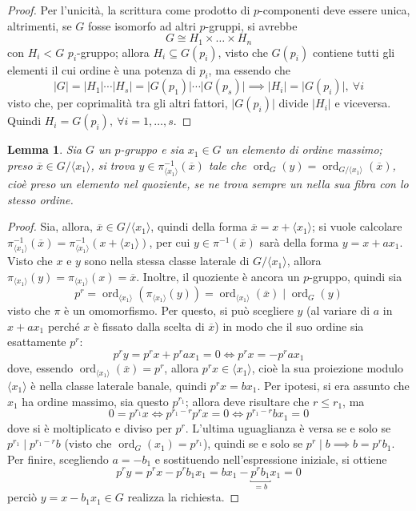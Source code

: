 \documentclass[11pt]{article}
\theoremstyle{style}
\newtheorem{lemma}{Lemma}[teorema]
\numberwithin{equation}{subsection}
\begin{document}
\begin{proof}
		Per l'unicit\`a, la scrittura come prodotto di $p$-componenti deve essere unica, altrimenti, se $G$ fosse isomorfo ad altri $p$-gruppi, si avrebbe
		\[
		G \cong H_1\times \ldots\times H_n
		\] 
		con $H_i<G$ $p_i$-gruppo; allora $H_i \subseteq G(p_i)$, visto che $G(p_i)$ contiene tutti gli elementi il cui ordine \`e una potenza di $p_i$, ma essendo che
		\[
		\lvert G \rvert =\lvert H_1 \rvert \cdots \lvert H_s \rvert = \lvert G(p_1) \rvert \cdots\lvert G(p_s) \rvert \implies \lvert H_i \rvert =\lvert G(p_i) \rvert , \ \forall i
		\] 
		visto che, per coprimalit\`a tra gli altri fattori, $\lvert G(p_i) \rvert  $ divide $ \lvert H_i \rvert $ e viceversa. Quindi $H_i = G(p_i), \ \forall i = 1,\ldots,s$.
\end{proof}
\begin{lemma}
	Sia $G$ un $p$-gruppo e sia $x_1\in G$ un elemento di ordine massimo; preso $\overline{x} \in G / \langle x_1 \rangle$, si trova $y \in \pi^{-1}_{\langle x_1 \rangle} (\overline{x})$ tale che $\operatorname{ord}_G(y)= \operatorname{ord}_{G/\langle x_1 \rangle} ( \overline{x})  $, cio\`e preso un elemento nel quoziente, se ne trova sempre un nella sua fibra con lo stesso ordine.
\end{lemma}
	\begin{proof}
		Sia, allora, $\overline{x}\in G / \langle x_1 \rangle$, quindi della forma $\overline{x}= x + \langle x_1 \rangle$; si vuole calcolare $\pi^{-1}_{\langle x_1 \rangle} (\overline{x}) = \pi^{-1}_{\langle x_1 \rangle} (x+\langle x_1 \rangle)$, per cui $y  \in \pi^{-1}(\overline{x})$ sar\`a della forma $y = x + ax_1$.
		Visto che $x$ e $y$ sono nella stessa classe laterale di $G / \langle x_1 \rangle$, allora $\pi_{\langle x_1 \rangle} (y) = \pi_{\langle x_1 \rangle} (x)= \overline{x}$.
		Inoltre, il quoziente \`e ancora un $p$-gruppo, quindi sia
		\[
		p^r = \operatorname{ord}_{\langle x_1 \rangle} (\pi_{\langle x_1 \rangle} (y)) =\operatorname{ord}_{\langle x_1 \rangle} (\overline{x})  \mid \operatorname{ord}_G(y) 
		\] 
		visto che $\pi$ \`e un omomorfismo.
		Per questo, si pu\`o scegliere $y$ (al variare di $a$ in $x+ ax_1$ perch\'e $x$ \`e fissato dalla scelta di $\overline{x}$) in modo che il suo ordine sia esattamente $p^r$:
		\[
		p^r y = p^r x + p^r ax_1 = 0 \iff p^r x = - p^r ax_1
		\] 
		dove, essendo $\operatorname{ord}_{\langle x_1 \rangle} (\overline{x}) =p^r$, allora $p^r x \in \langle x_1 \rangle$, cio\`e la sua proiezione modulo $\langle x_1 \rangle$ \`e nella classe laterale banale, quindi $p^rx = bx_1$.
		Per ipotesi, si era assunto che $x_1$ ha ordine massimo, sia questo $p^{r_1} $; allora deve risultare che $r\le r_1$, ma 
		\[
		0 = p^{r_1} x \iff p^{r_1-r} p^r x = 0 \iff p^{r_1-r} bx_1=0
		\] 
		dove si \`e moltiplicato e diviso per $p^r$. 
		L'ultima uguaglianza \`e versa se e solo se $p^{r_1}  \mid p^{r_1-r} b$ (visto che $\operatorname{ord}_G(x_1) =p^{r_1} $), quindi se e solo se $p^r  \mid b \implies b = p^r b_1$.
		Per finire, scegliendo $a = -b_1$  e sostituendo nell'espressione iniziale, si ottiene 
		\[
			p^r y = p^r x - p^r b_1x_1=bx_1 - \underbracket{p^r b_1}_{=b}  x_1 = 0
		\] 
		perci\`o $y= x - b_1 x_1 \in G$ realizza la richiesta.
	\end{proof}
\end{document}
